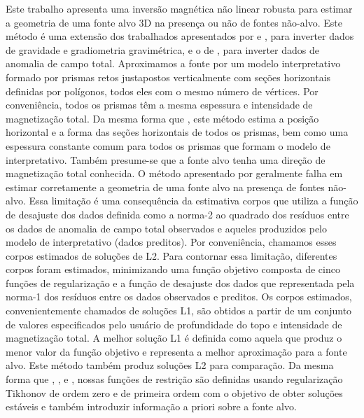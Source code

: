 Este trabalho apresenta uma inversão magnética não linear robusta para estimar a geometria de uma fonte alvo 3D na presença ou não de fontes não-alvo.
Este método é uma extensão dos trabalhados apresentados por \citet{oliveirajr_etal2011} e 
\citet{oliveirajr_barbosa2013}, para inverter dados de gravidade e gradiometria gravimétrica, e o de \citet{vital_etal2019}, para inverter dados de anomalia de campo total.
Aproximamos a fonte por um modelo interpretativo formado por prismas retos justapostos verticalmente com seções horizontais definidas por polígonos, todos eles com o mesmo número de vértices.
Por conveniência, todos os prismas têm a mesma espessura e intensidade de magnetização total.
Da mesma forma que \citet{vital_etal2019}, este método estima a posição horizontal e a forma das seções horizontais de todos os prismas, bem como uma espessura constante comum para todos os prismas que formam o modelo de interpretativo.
Também presume-se que a fonte alvo tenha uma direção de magnetização total conhecida.
O método apresentado por \citet{vital_etal2019} geralmente falha em estimar corretamente a geometria de uma fonte alvo na presença de fontes não-alvo.
Essa limitação é uma consequência da estimativa corpos que utiliza a função de desajuste dos dados definida como a norma-2 ao quadrado dos resíduos entre os dados de anomalia de campo total observados e aqueles produzidos pelo modelo de interpretativo (dados preditos).
Por conveniência, chamamos esses corpos estimados de soluções de L2.
Para contornar essa limitação, diferentes corpos foram estimados, minimizando uma função objetivo composta de cinco funções de regularização e a função de desajuste dos dados que representada pela norma-1 dos resíduos entre os dados observados e preditos.
Os corpos estimados, convenientemente chamados de soluções L1, são obtidos a partir de um conjunto de valores especificados pelo usuário de profundidade do topo e intensidade de magnetização total.
A melhor solução L1 é definida como aquela que produz o menor valor da função objetivo e representa a melhor aproximação para a fonte alvo.
Este método também produz soluções L2 para comparação.
Da mesma forma que \citet{oliveirajr_etal2011}, \citet{oliveirajr_barbosa2013}, e \citet{vital_etal2019}, nossas funções de restrição são definidas usando regularização Tikhonov de ordem zero e de primeira ordem \citep[por exemplo,][p. 96 e 104]{aster_etal2019} com o objetivo de obter soluções estáveis e também introduzir informação a priori sobre a fonte alvo.

